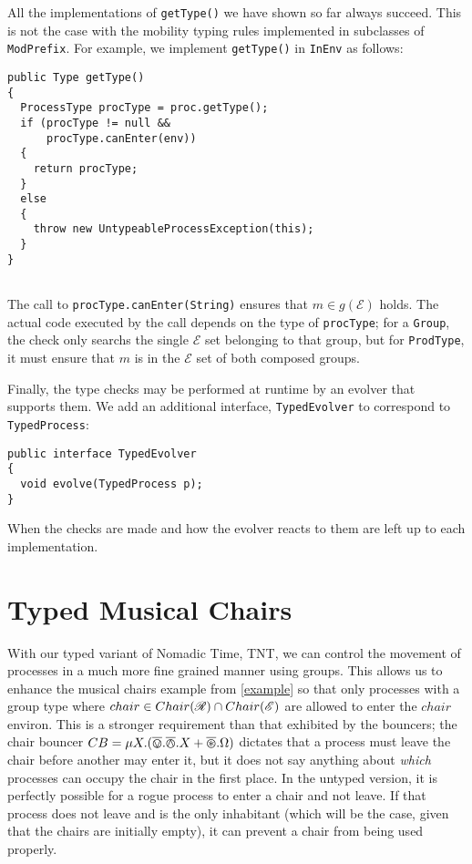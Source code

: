 All the implementations of \texttt{getType()} we have shown so far
always succeed.  This is not the case with the mobility typing rules
implemented in subclasses of \texttt{ModPrefix}.  For example, we
implement \texttt{getType()} in \texttt{InEnv} as follows:

\begin{verbatim}
public Type getType()
{
  ProcessType procType = proc.getType();  
  if (procType != null &&
      procType.canEnter(env))
  {
    return procType;
  }
  else
  {
    throw new UntypeableProcessException(this);
  }
}
 
\end{verbatim}

\noindent The call to \texttt{procType.canEnter(String)} ensures that
$m \in g(\mathscr{E})$ holds.  The actual code executed by the call
depends on the type of \texttt{procType}; for a \texttt{Group}, the
check only searchs the single $\mathcal{E}$ set belonging to that
group, but for \texttt{ProdType}, it must ensure that $m$ is in the
$\mathcal{E}$ set of both composed groups.

Finally, the type checks may be performed at runtime by an evolver
that supports them.  We add an additional interface,
\texttt{TypedEvolver} to correspond to \texttt{TypedProcess}:

\begin{verbatim}
public interface TypedEvolver
{
  void evolve(TypedProcess p);
}
\end{verbatim}

\noindent When the checks are made and how the evolver reacts to them
are left up to each implementation.

\section{Typed Musical Chairs}

With our typed variant of Nomadic Time, TNT, we can control the
movement of processes in a much more fine grained manner using groups.
This allows us to enhance the musical chairs example from
\ref{example} so that only processes with a group type where $chair
\in Chair(\mathscr{R}) \cap Chair(\mathscr{E})$ are allowed to enter the
$chair$ environ.  This is a stronger requirement than that exhibited
by the bouncers; the chair bouncer $CB = \mu X.(\overline{\varovee} .\overline{\varowedge} .X +
\overline{\varoast} .\Omega)$ dictates that a process must leave the chair before
another may enter it, but it does not say anything about \emph{which}
processes can occupy the chair in the first place.  In the untyped
version, it is perfectly possible for a rogue process to enter a chair
and not leave.  If that process does not leave and is the only
inhabitant (which will be the case, given that the chairs are
initially empty), it can prevent a chair from being used properly.


